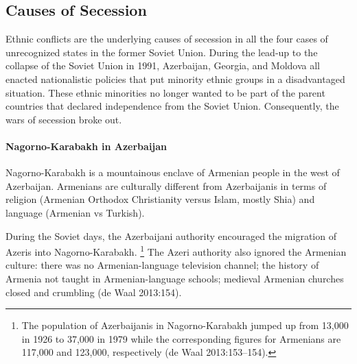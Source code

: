 \documentclass[12pt,a4paper]{article}%
\begin{document}



 

  
\subsection{Causes of Secession}
Ethnic conflicts are the underlying causes of secession in all the four cases of unrecognized states in the former Soviet Union.
During the lead-up to the collapse of the Soviet Union in 1991, Azerbaijan, Georgia, and Moldova all enacted nationalistic policies that put minority ethnic groups in a disadvantaged situation. 
These ethnic minorities no longer wanted to be part of the parent countries that declared independence from the Soviet Union.
Consequently, the wars of secession broke out.

\paragraph{Nagorno-Karabakh in Azerbaijan}
Nagorno-Karabakh is a mountainous enclave of Armenian people in the west of Azerbaijan. 
Armenians are culturally different from Azerbaijanis in terms of religion (Armenian Orthodox Christianity versus Islam, mostly Shia) and language (Armenian vs Turkish). 

During the Soviet days, the Azerbaijani authority encouraged the migration of Azeris into Nagorno-Karabakh.%
\footnote{
	The population of Azerbaijanis in Nagorno-Karabakh jumped up from 13,000 in 1926 to 37,000 in 1979 while the corresponding figures for Armenians are 117,000 and 123,000, respectively (de Waal 2013:153--154).
	} 
The Azeri authority also ignored the Armenian culture: there was no Armenian-language television channel; the history of Armenia not taught in Armenian-language schools; medieval Armenian churches closed and crumbling (de Waal 2013:154).  
\end{document}
